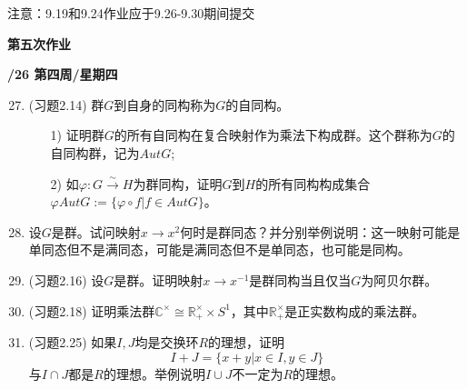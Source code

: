 \documentclass[a4paper,12pt]{article}
\begin{document}
{\color{red} 注意：9.19和9.24作业应于9.26-9.30期间提交}


\newpage
\head

 \begin{center} %
	{\Large \bf 第五次作业} %
	\vspace{2mm}
	
	{\bf{}/26 \quad  第四周/星期四} %

\end{center} 

 \begin{enumerate}\setcounter{enumi}{26}
     \item (习题2.14) 群$G$到自身的同构称为$G$的自同构。
     \begin{itemize}
         \item[1)] 证明群$G$的所有自同构在复合映射作为乘法下构成群。这个群称为$G$的自同构群，记为$AutG$;
         \item[2)] 如$\varphi:G\stackrel{\sim}{\longrightarrow}H$为群同构，证明$G$到$H$的所有同构构成集合$\varphi AutG := \{\varphi \circ f | f \in AutG\}$。
     \end{itemize}
     
     \item 设$G$是群。试问映射$x \rightarrow x^2$何时是群同态？并分别举例说明：这一映射可能是单同态但不是满同态，可能是满同态但不是单同态，也可能是同构。
     
     \item (习题2.16) 设$G$是群。证明映射$x \rightarrow x^{-1}$是群同构当且仅当$G$为阿贝尔群。
     
     \item (习题2.18) 证明乘法群$\mathbb{C}^{\times} \cong \mathbb{R}^{\times}_+ \times S^1$，其中$\mathbb{R}^{\times}_+$是正实数构成的乘法群。
     
     \item (习题2.25) 如果$I, J$均是交换环$R$的理想，证明
     $$ I + J = \{x + y | x \in I, y \in J\} $$
     与$I \cap J$都是$R$的理想。举例说明$I \cup J$不一定为$R$的理想。
     

\end{enumerate}
\end{document}

